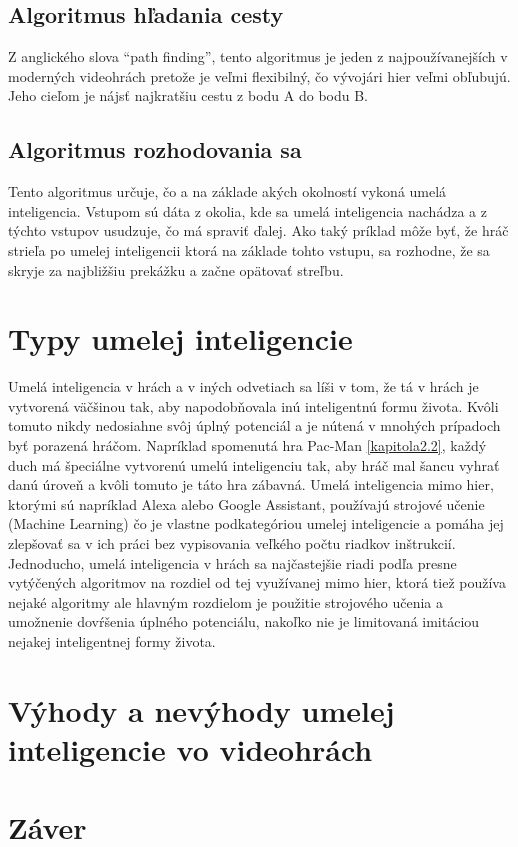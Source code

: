 \documentclass[10pt,oneside,slovak,a4paper]{article}
\begin{document}
\subsection{Algoritmus hľadania cesty} \label{kapitola3.1}
Z anglického slova “path finding”, tento algoritmus je jeden z najpoužívanejších v moderných videohrách pretože je veľmi flexibilný, čo vývojári hier veľmi obľubujú. Jeho cieľom je nájsť najkratšiu cestu z bodu A do bodu B. 

\subsection{Algoritmus rozhodovania sa} \label{kapitola3.2}
Tento algoritmus určuje, čo a na základe akých okolností vykoná umelá inteligencia. Vstupom sú dáta z okolia, kde sa umelá inteligencia nachádza a z týchto vstupov usudzuje, čo má spraviť ďalej. Ako taký príklad môže byť, že hráč strieľa po umelej inteligencii ktorá na základe tohto vstupu, sa rozhodne, že sa skryje za najbližšiu prekážku a začne opätovať streľbu.


\section{Typy umelej inteligencie} \label{kapitola4}
Umelá inteligencia v hrách a v iných odvetiach sa líši v tom, že tá v hrách je vytvorená väčšinou tak, aby napodobňovala inú inteligentnú formu života. Kvôli tomuto nikdy nedosiahne svôj úplný potenciál a je nútená v mnohých prípadoch byť porazená hráčom. Napríklad spomenutá hra Pac-Man \ref{kapitola2.2}, každý duch má špeciálne vytvorenú umelú inteligenciu tak, aby hráč mal šancu vyhrať danú úroveň a kvôli tomuto je táto hra zábavná. Umelá inteligencia mimo hier, ktorými sú napríklad Alexa alebo Google Assistant, používajú strojové učenie (Machine Learning) čo je vlastne podkategóriou umelej inteligencie a pomáha jej zlepšovať sa v ich práci bez vypisovania veľkého počtu riadkov inštrukcií. Jednoducho, umelá inteligencia v hrách sa najčastejšie riadi podľa presne vytýčených algoritmov na rozdiel od tej využívanej mimo hier, ktorá tiež používa nejaké algoritmy ale hlavným rozdielom je použitie strojového učenia a umožnenie dovŕšenia úplného potenciálu, nakoľko nie je limitovaná imitáciou nejakej inteligentnej formy života.


\section{Výhody a nevýhody umelej inteligencie vo videohrách} \label{kapitola5}


\section{Záver} \label{zaver} %






\end{document}
